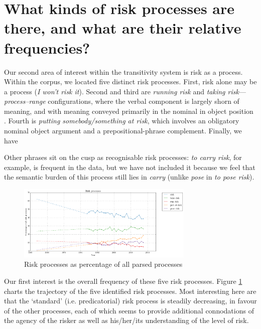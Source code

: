 \section{What kinds of risk processes are there, and what are their relative frequencies?} \FloatBarrier

    Our second area of interest within the transitivity system is risk as a process. Within the corpus, we located five distinct risk processes. First, risk alone may be a process (\emph{I won't risk it}). Second and third are \emph{running risk} and \emph{taking risk}---\emph{process--range} configurations, where the verbal component is largely shorn of meaning, and with meaning conveyed primarily in the nominal in object position \cite{halliday_introduction_2004}. Fourth is \emph{putting somebody/something at risk}, which involves an obligatory nominal object argument and a prepositional-phrase complement. Finally, we have

    Other phrases sit on the cusp as recognisable risk processes: \emph{to carry risk}, for example, is frequent in the data, but we have not included it because we feel that the semantic burden of this process still lies in \emph{carry} (unlike \emph{pose} in \emph{to pose risk}).

    \begin{figure}[htb!]
    \centering
    \includegraphics[width=0.75\textwidth]{../images/risk_processes.png}
    \caption{Risk processes as percentage of all parsed processes}
    \label{fig:riskprocesses}
    \end{figure}
    Our first interest is the overall frequency of these five risk processes. 
    Figure \ref{fig:riskprocesses} charts the trajectory of the five identified risk processes. Most interesting here are that the `standard' (i.e. predicatorial) risk process is steadily decreasing, in favour of the other processes, each of which seems to provide additional connodations of the agency of the risker as well as his\slash her\slash its understanding of the level of risk. 

